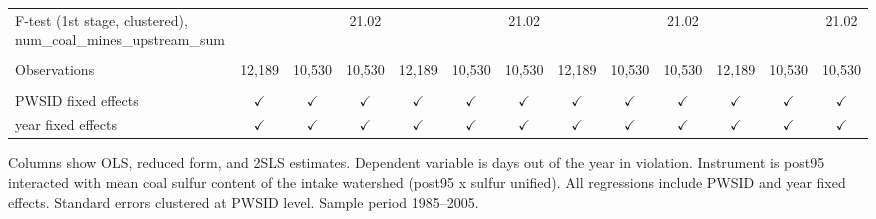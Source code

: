 \begin{table}[htbp]
\begin{adjustbox}{width = \textwidth, center}
\begin{tabular}{lcccccccccccc}
         F-test (1st stage, clustered), num\_coal\_mines\_upstream\_sum     &               &               & 21.02         &               &                & 21.02         &               &               & 21.02         &               &               & 21.02\\  
         
          \\
         
         Observations                                                       & 12,189        & 10,530        & 10,530        & 12,189        & 10,530         & 10,530        & 12,189        & 10,530        & 10,530        & 12,189        & 10,530        & 10,530\\  
         
          \\
         
         PWSID fixed effects                                                & $\checkmark$  & $\checkmark$  & $\checkmark$  & $\checkmark$  & $\checkmark$   & $\checkmark$  & $\checkmark$  & $\checkmark$  & $\checkmark$  & $\checkmark$  & $\checkmark$  & $\checkmark$\\   
         year fixed effects                                                 & $\checkmark$  & $\checkmark$  & $\checkmark$  & $\checkmark$  & $\checkmark$   & $\checkmark$  & $\checkmark$  & $\checkmark$  & $\checkmark$  & $\checkmark$  & $\checkmark$  & $\checkmark$\\   
         
         \bottomrule
         
      \end{tabular}
      
      
      
   \end{adjustbox}
      {\tiny\linespread{1}\selectfont \par \raggedright 
   Columns show OLS, reduced form, and 2SLS estimates. Dependent variable is days out of the year in violation. Instrument is post95 interacted with mean coal sulfur content of the intake watershed (post95 x sulfur unified). All regressions include PWSID and year fixed effects. Standard errors clustered at PWSID level. Sample period 1985--2005.}
   
\end{table}


